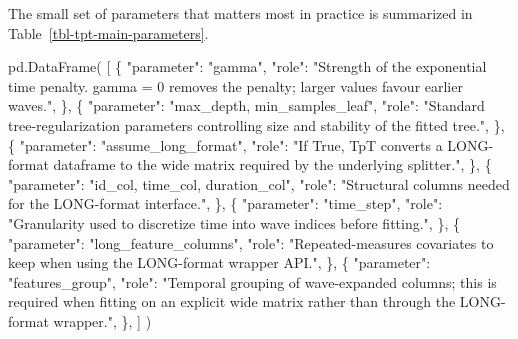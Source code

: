 \documentclass[
  letterpaper,
  DIV=11,
  numbers=noendperiod]{scrartcl}
\newenvironment{Shaded}{\begin{snugshade}}{\end{snugshade}}
\newcommand{\NormalTok}[1]{\textcolor[rgb]{0.00,0.23,0.31}{#1}}
\newcommand{\StringTok}[1]{\textcolor[rgb]{0.13,0.47,0.30}{#1}}
\begin{document}
The small set of parameters that matters most in practice is summarized
in Table~\ref{tbl-tpt-main-parameters}.

\begin{Shaded}
\begin{Highlighting}[]
\NormalTok{pd.DataFrame(}
\NormalTok{    [}
\NormalTok{        \{}
            \StringTok{"parameter"}\NormalTok{: }\StringTok{"gamma"}\NormalTok{,}
            \StringTok{"role"}\NormalTok{: }\StringTok{"Strength of the exponential time penalty. \textasciigrave{}gamma = 0\textasciigrave{} removes the penalty; larger values favour earlier waves."}\NormalTok{,}
\NormalTok{        \},}
\NormalTok{        \{}
            \StringTok{"parameter"}\NormalTok{: }\StringTok{"max\_depth, min\_samples\_leaf"}\NormalTok{,}
            \StringTok{"role"}\NormalTok{: }\StringTok{"Standard tree{-}regularization parameters controlling size and stability of the fitted tree."}\NormalTok{,}
\NormalTok{        \},}
\NormalTok{        \{}
            \StringTok{"parameter"}\NormalTok{: }\StringTok{"assume\_long\_format"}\NormalTok{,}
            \StringTok{"role"}\NormalTok{: }\StringTok{"If \textasciigrave{}True\textasciigrave{}, TpT converts a LONG{-}format dataframe to the wide matrix required by the underlying splitter."}\NormalTok{,}
\NormalTok{        \},}
\NormalTok{        \{}
            \StringTok{"parameter"}\NormalTok{: }\StringTok{"id\_col, time\_col, duration\_col"}\NormalTok{,}
            \StringTok{"role"}\NormalTok{: }\StringTok{"Structural columns needed for the LONG{-}format interface."}\NormalTok{,}
\NormalTok{        \},}
\NormalTok{        \{}
            \StringTok{"parameter"}\NormalTok{: }\StringTok{"time\_step"}\NormalTok{,}
            \StringTok{"role"}\NormalTok{: }\StringTok{"Granularity used to discretize time into wave indices before fitting."}\NormalTok{,}
\NormalTok{        \},}
\NormalTok{        \{}
            \StringTok{"parameter"}\NormalTok{: }\StringTok{"long\_feature\_columns"}\NormalTok{,}
            \StringTok{"role"}\NormalTok{: }\StringTok{"Repeated{-}measures covariates to keep when using the LONG{-}format wrapper API."}\NormalTok{,}
\NormalTok{        \},}
\NormalTok{        \{}
            \StringTok{"parameter"}\NormalTok{: }\StringTok{"features\_group"}\NormalTok{,}
            \StringTok{"role"}\NormalTok{: }\StringTok{"Temporal grouping of wave{-}expanded columns; this is required when fitting on an explicit wide matrix rather than through the LONG{-}format wrapper."}\NormalTok{,}
\NormalTok{        \},}
\NormalTok{    ]}
\NormalTok{)}
\end{Highlighting}
\end{Shaded}
\end{document}
